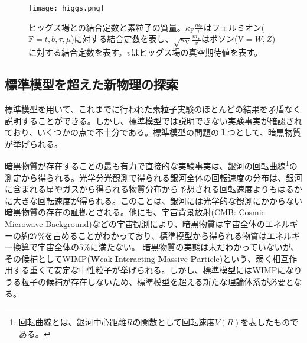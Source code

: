 \begin{figure}[tbp]
  \centering
  \texttt{[image: higgs.png]}
  \caption[ヒッグス場との結合定数と素粒子の質量]{ヒッグス場との結合定数と素粒子の質量\cite{higgs}。$\kappa_\mathrm{F} \frac{m_\mathrm{F}}{v}$はフェルミオン($\mathrm{F}=t, b, \tau, \mu$)に対する結合定数を表し、$\sqrt{\kappa_\mathrm{V}} \frac{m_\mathrm{V}}{v}$はボソン($\mathrm{V}=W, Z$)に対する結合定数を表す。$v$はヒッグス場の真空期待値を表す。 }
  \label{fig:higgs}
\end{figure}

\subsection{標準模型を超えた新物理の探索}
\label{sec:bsm}

標準模型を用いて、これまでに行われた素粒子実験のほとんどの結果を矛盾なく説明することができる。しかし、標準模型では説明できない実験事実が確認されており、いくつかの点で不十分である。標準模型の問題の１つとして、暗黒物質が挙げられる。

暗黒物質が存在することの最も有力で直接的な実験事実は、銀河の回転曲線\footnote{回転曲線とは、銀河中心距離$R$の関数として回転速度$V(R)$を表したものである。}の測定から得られる。光学分光観測で得られる銀河全体の回転速度の分布は、銀河に含まれる星やガスから得られる物質分布から予想される回転速度よりもはるかに大きな回転速度が得られる。このことは、銀河には光学的な観測にかからない暗黒物質の存在の証拠とされる。他にも、宇宙背景放射(CMB: Cosmic Microwave Background)などの宇宙観測により、暗黒物質は宇宙全体のエネルギーの約$27\%$を占めることがわかっており、標準模型から得られる物質はエネルギー換算で宇宙全体の$5\%$に満たない。
暗黒物質の実態は未だわかっていないが、その候補としてWIMP(\textbf{W}eak \textbf{I}nteracting \textbf{M}assive \textbf{P}article)という、弱く相互作用する重くて安定な中性粒子が挙げられる。しかし、標準模型にはWIMPになりうる粒子の候補が存在しないため、標準模型を超える新たな理論体系が必要となる。


